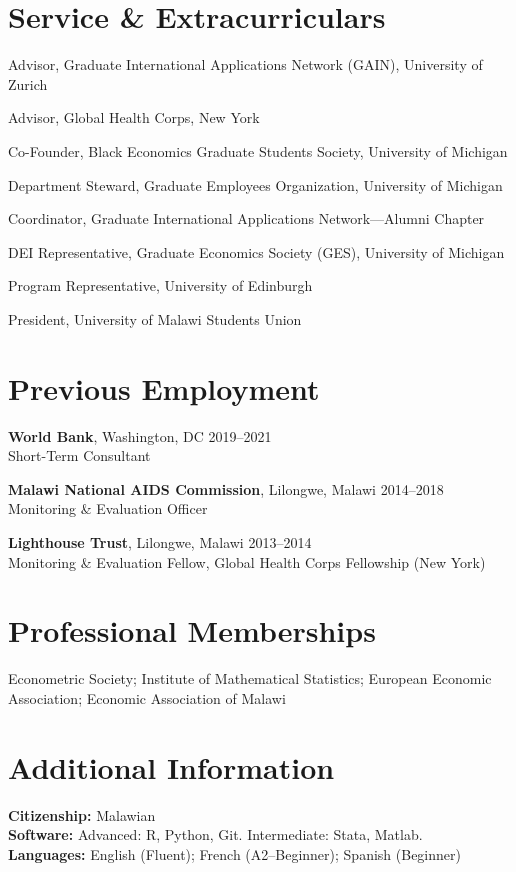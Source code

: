 \documentclass[11pt]{article}
\begin{document}
\section*{Service \& Extracurriculars}
\begin{dated}
\item[2024--Present] Advisor, Graduate International Applications Network (GAIN), University of Zurich
\item[2022--Present] Advisor, Global Health Corps, New York
\item[2023] Co-Founder, Black Economics Graduate Students Society, University of Michigan
\item[2023] Department Steward, Graduate Employees Organization, University of Michigan
\item[2022--2024] Coordinator, Graduate International Applications Network---Alumni Chapter
\item[2022] DEI Representative, Graduate Economics Society (GES), University of Michigan
\item[2018--2019] Program Representative, University of Edinburgh
\item[2010--2012] President, University of Malawi Students Union
\end{dated}

\section*{Previous Employment}
\textbf{World Bank}, Washington, DC \hfill 2019--2021 \\
Short-Term Consultant

\vspace{0.4em}
\textbf{Malawi National AIDS Commission}, Lilongwe, Malawi \hfill 2014--2018 \\
Monitoring \& Evaluation Officer

\vspace{0.4em}
\textbf{Lighthouse Trust}, Lilongwe, Malawi \hfill 2013--2014 \\
Monitoring \& Evaluation Fellow, Global Health Corps Fellowship (New York)

\section*{Professional Memberships}
Econometric Society; Institute of Mathematical Statistics; European Economic Association; Economic Association of Malawi

\section*{Additional Information}
\textbf{Citizenship:} Malawian \\
\textbf{Software:} Advanced: R, Python, Git. Intermediate: Stata, Matlab. \\
\textbf{Languages:} English (Fluent); French (A2--Beginner); Spanish (Beginner)
\end{document}
